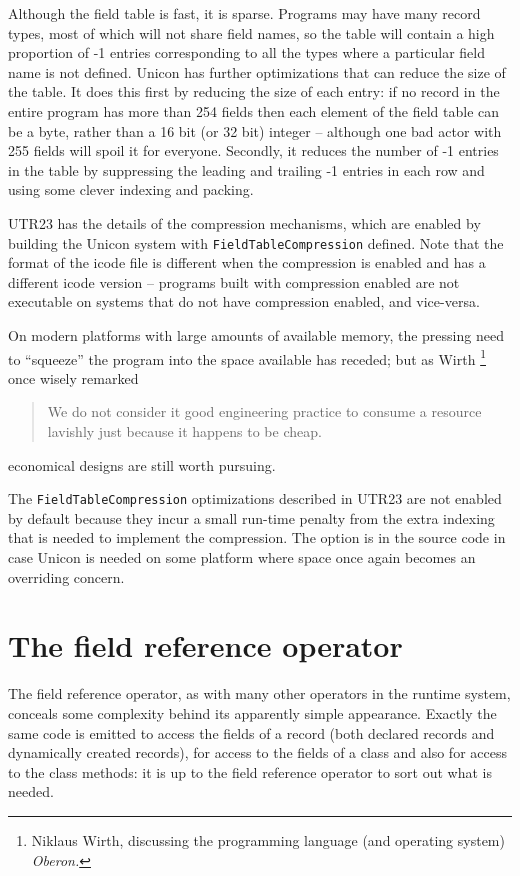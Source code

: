 Although the field table is fast, it is sparse.  Programs may have many
record types, most of which will not share field names, so the table will
contain a high proportion of -1 entries corresponding to all the types where
a particular field name is not defined. Unicon has further optimizations
that can reduce the size of the table. It does this first by reducing the
size of each entry: if no record in the entire program has more than 254
fields then each element of the field table can be a byte, rather than a 16
bit (or 32 bit) integer -- although one bad actor with 255 fields will spoil
it for everyone. Secondly, it reduces the number of -1 entries in the table
by suppressing the leading and trailing -1 entries in each row and using
some clever indexing and packing.

UTR23 has the details of the compression mechanisms, which are enabled by
building the Unicon system with \texttt{FieldTableCompression} defined. Note
that the format of the icode file is different when the compression is
enabled and has a different icode version -- programs built with compression
enabled are not executable on systems that do not have compression enabled,
and vice-versa.

On modern platforms with large amounts of available memory, the pressing
need to ``squeeze'' the program into the space available has receded; but as
Wirth%
\footnote{
Niklaus Wirth, discussing the programming language (and operating system) \em{Oberon}.
} once wisely remarked
\begin{quote}
We do not consider it good engineering practice to consume a resource lavishly
just because it happens to be cheap.
\end{quote}
economical designs are still worth pursuing.

The \texttt{FieldTableCompression} optimizations described in UTR23 are not
enabled by default because they incur a small run-time penalty from the
extra indexing that is needed to implement the compression. The option is in
the source code in case Unicon is needed on some platform where space once
again becomes an overriding concern.

\section{The field reference operator}
The field reference operator, as with many other operators in the runtime
system, conceals some complexity behind its apparently simple
appearance. Exactly the same code is emitted to access the fields of a
record (both declared records and dynamically created records), for access
to the fields of a class and also for access to the class methods: it is up
to the field reference operator to sort out what is needed.

